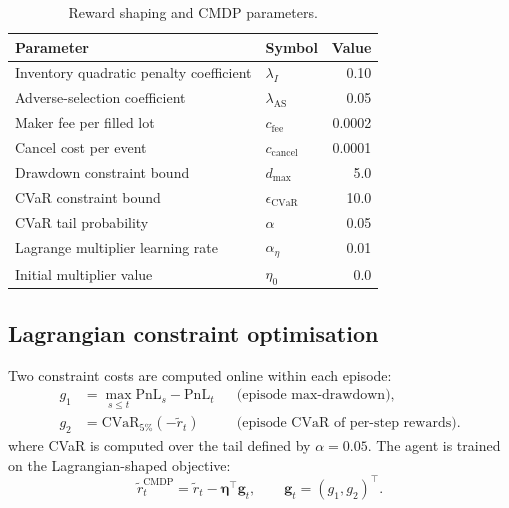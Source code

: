 \documentclass[11pt]{article}
\newcommand{\PnL}{\mathrm{PnL}}
\newcommand{\CVaR}{\mathrm{CVaR}}
\begin{document}
\begin{table}[H]
\centering
\caption{Reward shaping and CMDP parameters.}
\label{tab:reward_params}
\begin{tabular}{@{}llr@{}}
\toprule
Parameter & Symbol & Value \\
\midrule
Inventory quadratic penalty coefficient & $\lambda_I$ & 0.10 \\
Adverse-selection coefficient           & $\lambda_{\text{AS}}$ & 0.05 \\
Maker fee per filled lot                & $c_{\text{fee}}$ & 0.0002 \\
Cancel cost per event                   & $c_{\text{cancel}}$ & 0.0001 \\
\midrule
Drawdown constraint bound               & $d_{\max}$ & 5.0 \\
CVaR constraint bound                   & $\epsilon_{\text{CVaR}}$ & 10.0 \\
CVaR tail probability                   & $\alpha$ & 0.05 \\
Lagrange multiplier learning rate       & $\alpha_\eta$ & 0.01 \\
Initial multiplier value                & $\eta_0$ & 0.0 \\
\bottomrule
\end{tabular}
\end{table}

\subsection{Lagrangian constraint optimisation}
\label{sec:lagrangian}

Two constraint costs are computed online within each episode:
\begin{align}
  g_1 &= \max_{s \le t} \PnL_s - \PnL_t
    && \text{(episode max-drawdown)}, \\
  g_2 &= \CVaR_{5\%}\!\left(-\tilde{r}_t\right)
    && \text{(episode CVaR of per-step rewards)}.
\end{align}
where CVaR is computed over the tail defined by $\alpha = 0.05$.
The agent is trained on the Lagrangian-shaped objective:
\begin{equation}
  \tilde{r}_t^{\text{CMDP}} = \tilde{r}_t
    - \boldsymbol{\eta}^\top \mathbf{g}_t,
  \qquad \mathbf{g}_t = (g_1, g_2)^\top.
\end{equation}
\end{document}
